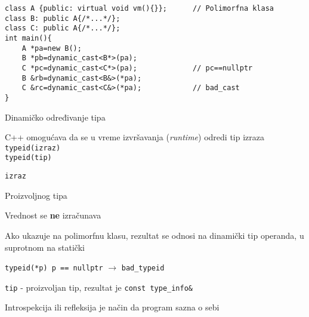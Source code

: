 \documentclass{article}
\newenvironment{xitemize}{%
    
    \itemize
    \larger
}{%
    \enditemize
}
\let\olditemize\itemize
\let\endolditemize\enditemize
\renewenvironment{itemize}{%
    \smaller
    \olditemize
}{%
    \endolditemize
}
\providecommand{\inlinecode}[1]{\texttt{#1}}
\begin{document}
\begin{xitemize}
\begin{itemize}
    \begin{lstlisting}
class A {public: virtual void vm(){}};      // Polimorfna klasa
class B: public A{/*...*/};
class C: public A{/*...*/};
int main(){
    A *pa=new B();
    B *pb=dynamic_cast<B*>(pa);
    C *pc=dynamic_cast<C*>(pa);             // pc==nullptr
    B &rb=dynamic_cast<B&>(*pa);
    C &rc=dynamic_cast<C&>(*pa);            // bad_cast
}
    \end{lstlisting}
\end{itemize}
\item Dinamičko određivanje tipa
\begin{itemize}
    \item C++ omogućava da se u vreme izvršavanja (\textit{runtime}) odredi tip izraza\\
    \inlinecode{typeid(izraz)}\\
    \inlinecode{typeid(tip)}
    \item \inlinecode{izraz}
    \begin{itemize}
        \item Proizvoljnog tipa
        \item Vrednost se \textbf{ne} izračunava
        \item Ako ukazuje na polimorfnu klasu, rezultat se odnosi na dinamički tip operanda, u suprotnom na statički
        \item \inlinecode{typeid(*p) p == nullptr} $\rightarrow$ \inlinecode{bad\_typeid}
    \end{itemize}
    \item \inlinecode{tip} - proizvoljan tip, rezultat je \inlinecode{const type\_info\&}
    \item Introspekcija ili refleksija je način da program sazna o sebi


\end{itemize}
\end{xitemize}
\end{document}
